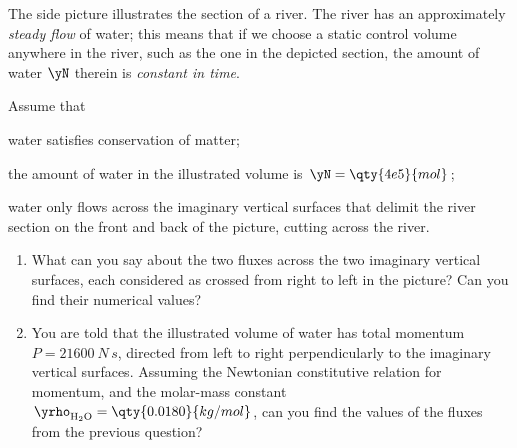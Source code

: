 \smallskip

\begin{exercise}
  The side picture illustrates the section of a river. The river has an approximately \emph{steady flow} of water; this means that if we choose a static control volume anywhere in the river, such as the one in the depicted section, the amount of water $\yN$ therein is \emph{constant in time}.

  Assume that
  \begin{enumerate*}[label=(\alph*)]
  \item water satisfies conservation of matter;
  \item the amount of water in the illustrated volume is $\yN=\qty{4e5}{mol}$;
  \item water only flows across the imaginary vertical surfaces that delimit the river section on the front and back of the picture, cutting across the river.
  \end{enumerate*}
  \begin{enumerate}[exerc]
  \item What can you say about the two fluxes across the two imaginary vertical surfaces, each considered as crossed from right to left in the picture? Can you find their numerical values?

  \item You are told that the illustrated volume of water has total momentum $P=\qty{21600}{N\,s}$, directed from left to right perpendicularly to the imaginary vertical surfaces. Assuming the Newtonian constitutive relation for momentum, and the molar-mass constant $\yrho_{\mathrm{H_2O}}=\qty{0.0180}{kg/mol}$, can you find the values of the fluxes from the previous question?
  \end{enumerate}
\end{exercise}
%

